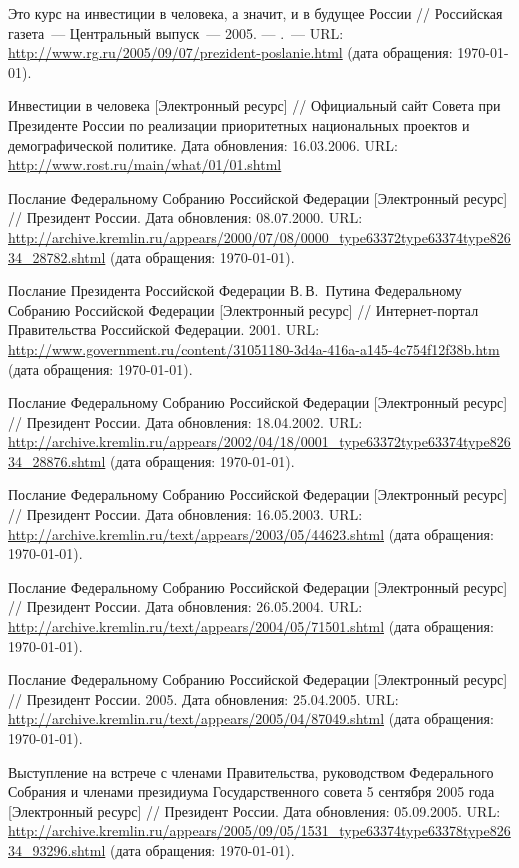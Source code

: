 \documentclass[article, 12pt, russian, oneside]{ncc}
\begin{document}
\begin{thebibliography}{30}
 Это курс на инвестиции в человека, а значит, и в
  будущее России // Российская газета~--- Центральный выпуск~---
  2005. — .~--- URL:
  \url{http://www.rg.ru/2005/09/07/prezident-poslanie.html} (дата
  обращения: \today).

 Инвестиции в человека [Электронный ресурс] //
  Официальный сайт Совета при Президенте России по реализации
  приоритетных национальных проектов и демографической политике. Дата
  обновления: 16.03.2006. URL:
  \url{http://www.rost.ru/main/what/01/01.shtml}

 Послание Федеральному Собранию Российской
  Федерации [Электронный ресурс] // Президент России. Дата обновления:
  08.07.2000.  URL:
  \url{http://archive.kremlin.ru/appears/2000/07/08/0000_type63372type63374type82634_28782.shtml}
  (дата обращения: \today).

Послание Президента Российской Федерации
  В.\,В.~Путина Федеральному Собранию Российской Федерации
  [Электронный ресурс] // Интернет-портал Правительства Российской
  Федерации. 2001.  URL:
  \url{http://www.government.ru/content/31051180-3d4a-416a-a145-4c754f12f38b.htm}
  (дата обращения: \today).

 Послание Федеральному Собранию Российской
  Федерации [Электронный ресурс] // Президент России. Дата обновления:
  18.04.2002. URL:
  \url{http://archive.kremlin.ru/appears/2002/04/18/0001_type63372type63374type82634_28876.shtml}
  (дата обращения: \today).

 Послание Федеральному Собранию Российской
  Федерации [Электронный ресурс] // Президент России. Дата обновления:
  16.05.2003. URL:
  \url{http://archive.kremlin.ru/text/appears/2003/05/44623.shtml}
  (дата обращения: \today).

 Послание Федеральному Собранию Российской
  Федерации [Электронный ресурс] // Президент России. Дата обновления:
  26.05.2004. URL:
  \url{http://archive.kremlin.ru/text/appears/2004/05/71501.shtml}
  (дата обращения: \today).

 Послание Федеральному Собранию Российской
  Федерации [Электронный ресурс] // Президент России. 2005. Дата
  обновления: 25.04.2005. URL:
  \url{http://archive.kremlin.ru/text/appears/2005/04/87049.shtml}
  (дата обращения: \today).

 Выступление на встрече с членами Правительства,
  руководством Федерального Собрания и членами президиума
  Государственного совета 5 сентября 2005 года [Электронный ресурс] // Президент
  России. Дата обновления: 05.09.2005. URL:
  \url{http://archive.kremlin.ru/appears/2005/09/05/1531_type63374type63378type82634_93296.shtml}
  (дата обращения: \today).
  
\end{thebibliography}
\end{document}
